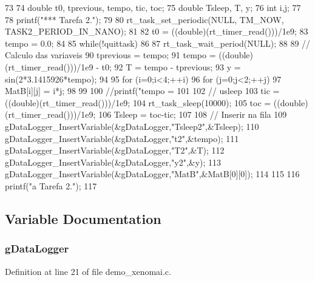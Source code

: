 \begin{DoxyCode}
73 {
74         double t0, tprevious, tempo, tic, toc;
75         double Tsleep, T, y;
76         int i,j;
77 
78         printf("\n**** Tarefa 2.");
79 
80         rt_task_set_periodic(NULL, TM_NOW, TASK2_PERIOD_IN_NANO);
81 
82         t0 = ((double)(rt_timer_read()))/1e9;
83         tempo = 0.0;
84 
85         while(!quittask)
86         {       
87                 rt_task_wait_period(NULL);
88 
89                 // Calculo das variaveis
90                 tprevious = tempo;
91                 tempo = ((double)(rt_timer_read()))/1e9 - t0;
92                 T = tempo - tprevious;
93                 y = sin(2*3.1415926*tempo);
94         
95                 for (i=0;i<4;++i){
96                         for (j=0;j<2;++j){
97                                 MatB[i][j] = i*j;
98                         }
99                 }
100                 //printf("\n tempo  = %
101         
102                 // usleep
103                 tic = ((double)(rt_timer_read()))/1e9;
104                 rt_task_sleep(10000);
105                 toc = ((double)(rt_timer_read()))/1e9;
106                 Tsleep = toc-tic;
107 
108                 // Inserir na fila
109                 gDataLogger_InsertVariable(&gDataLogger,"Tsleep2",&Tsleep);
110                 gDataLogger_InsertVariable(&gDataLogger,"t2",&tempo);
111                 gDataLogger_InsertVariable(&gDataLogger,"T2",&T);
112                 gDataLogger_InsertVariable(&gDataLogger,"y2",&y);
113                 gDataLogger_InsertVariable(&gDataLogger,"MatB",&MatB[0][0]);
114         }
115 
116         printf("\nEncerrando a Tarefa 2.");
117 }
\end{DoxyCode}


\subsection{Variable Documentation}
\subsubsection[{gDataLogger}]{ {\bf gDataLogger}}\label{demo__xenomai_8c_abe3b9c2c4e21e79c7b046b5986d13acc}


Definition at line 21 of file demo\_\-xenomai.c.
